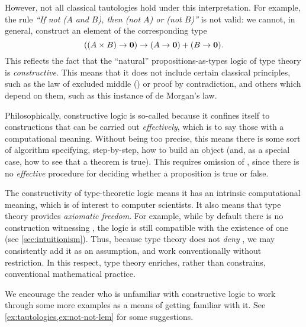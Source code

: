 However, not all classical tautologies hold under this interpretation.
For example, the rule 
\emph{``If not ($A$ and $B$), then (not $A$) or (not $B$)''} is not valid: we cannot, in general, construct an element of the corresponding type
\[ ((A \times B) \to \mathbf{0}) \to (A \to \mathbf{0}) + (B \to \mathbf{0}).\]
This reflects the fact that the ``natural'' propositions-as-types logic of type theory is \emph{constructive}.
This means that it does not include certain classical principles, such as the law of excluded middle (\LEM{})
or proof by contradiction,
and others which depend on them, such as this instance of de Morgan's law.
%
%

Philosophically, constructive logic is so-called because it confines itself to constructions that can be carried out \emph{effectively}, which is to say those with a computational meaning.
Without being too precise, this means there is some sort of algorithm specifying, step-by-step, how to build an object (and, as a special case, how to see that a theorem is true).
This requires omission of \LEM{}, since there is no \emph{effective} procedure for deciding whether a proposition is true or false.

The constructivity of type-theoretic logic means it has an intrinsic computational meaning, which is of interest to computer scientists.
It also means that type theory provides \emph{axiomatic freedom}.
For example, while by default there is no construction witnessing \LEM{}, the logic is still compatible with the existence of one (see \autoref{sec:intuitionism}).
Thus, because type theory does not \emph{deny} \LEM{}, we may consistently add it as an assumption, and work conventionally without restriction.
In this respect, type theory enriches, rather than constrains, conventional mathematical practice.

We encourage the reader who is unfamiliar with constructive logic to work through some more examples as a means of getting familiar with it.
See \autoref{ex:tautologies,ex:not-not-lem} for some suggestions.

\mentalpause


